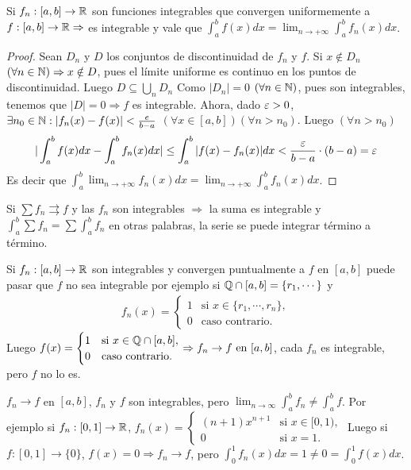 \begin{theorem}
  Si $f_n: [a, b] \to \mathbb{R}$ son funciones integrables que convergen uniformemente a $f: [a, b] \to \mathbb{R} \Rightarrow$ es integrable y vale que $\int_a^b f(x) dx = \lim_{n \to +\infty} \int_a^b f_n(x) dx$.
  \begin{proof}
    Sean $D_n$ y $D$ los conjuntos de discontinuidad de $f_n$ y $f$. Si $x \notin D_n$ $(\forall n \in \mathbb{N}) \Rightarrow x \notin D$, pues el límite uniforme es continuo en los puntos de discontinuidad. Luego $D \subseteq \bigcup_n D_n$ Como $|D_n| = 0$ $(\forall n \in \mathbb{N})$, pues son integrables, tenemos que $|D| = 0 \Rightarrow f$ es integrable. Ahora, dado $\varepsilon > 0$, $\exists n_0 \in \mathbb{N} : |f_n(x) - f(x)| < \frac{e}{b-a}$ $(\forall x \in [a, b])(\forall n > n_0)$. Luego $(\forall n > n_0)$ \begin{align*} |\int_a^b f(x) dx - \int_a^b f_n(x) dx| \leq \int_a^b |f(x) - f_n(x)|dx < \frac{\varepsilon}{b-a} \cdot (b-a) = \varepsilon
    \end{align*}
    Es decir que $\int_a^b \lim_{n \to +\infty} f_n(x) dx = \lim_{n \to +\infty} \int_a^b f_n(x) dx$.
  \end{proof}
\end{theorem}

\begin{corollary}
  Si $\sum f_n \rightrightarrows f$ y las $f_n$ son integrables $\Rightarrow$ la suma es integrable y $\int_a^b \sum f_n = \sum \int_a^b f_n$ en otras palabras, la serie se puede integrar término a término.
\end{corollary}

\begin{note}
  Si $f_n: [a, b] \to \mathbb{R}$ son integrables y convergen puntualmente a $f$ en $[a, b]$ puede pasar que $f$ no sea integrable por ejemplo si $\mathbb{Q} \cap [a, b] = \{r_1, \cdots\}$ y
  \begin{align*}
    f_n(x) = \begin{cases}
               1 & \text{si } x \in \{r_1, \cdots, r_n\}, \\
               0 & \text{caso contrario}.
             \end{cases}
  \end{align*}
  Luego $f(x) = \begin{cases}
      1 & \text{si } x \in \mathbb{Q} \cap [a, b], \\
      0 & \text{caso contrario}.
    \end{cases} \Rightarrow f_n \to f \text{ en } [a, b]$, cada $f_n$ es integrable, pero $f$ no lo es.
\end{note}

\begin{note}
  $f_n \to f$ en $[a, b]$, $f_n$ y $f$ son integrables, pero $\lim_{n \to \infty} \int_a^b f_n \neq \int_a^b f$. Por ejemplo si $f_n: [0, 1] \to \mathbb{R}$, $f_n(x) = \begin{cases}
      (n+1) x^{n+1} & \text{si } x \in [0, 1), \\
      0             & \text{si } x = 1.
    \end{cases}$ Luego si $f: [0, 1] \to \{0\}$, $f(x) = 0 \Rightarrow f_n \to f$, pero $\int_0^1 f_n(x) dx = 1 \neq 0 = \int_0^1 f(x) dx$.
\end{note}
